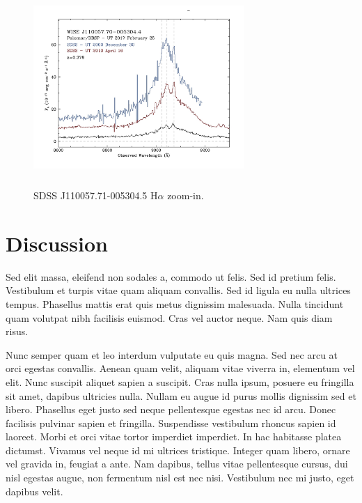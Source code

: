 \documentclass{emulateapj}
\begin{document}
\begin{figure}
  \includegraphics[width=8.00cm, height=7.50cm, trim=0.0cm 0.0cm 0.0cm 0.0cm, clip]
  {../plots/w1100m0052_halpha.jpg}
  \centering
  \caption[]{SDSS J110057.71-005304.5 H$\alpha$ zoom-in.}
 \label{fig:w1100m0052_halpha}
\end{figure}



\section{Discussion}
Sed elit massa, eleifend non sodales a, commodo ut felis. Sed id
pretium felis. Vestibulum et turpis vitae quam aliquam convallis. Sed
id ligula eu nulla ultrices tempus. Phasellus mattis erat quis metus
dignissim malesuada. Nulla tincidunt quam volutpat nibh facilisis
euismod. Cras vel auctor neque. Nam quis diam risus.

Nunc semper quam et leo interdum vulputate eu quis magna. Sed nec arcu
at orci egestas convallis. Aenean quam velit, aliquam vitae viverra
in, elementum vel elit. Nunc suscipit aliquet sapien a suscipit. Cras
nulla ipsum, posuere eu fringilla sit amet, dapibus ultricies
nulla. Nullam eu augue id purus mollis dignissim sed et
libero. Phasellus eget justo sed neque pellentesque egestas nec id
arcu. Donec facilisis pulvinar sapien et fringilla. Suspendisse
vestibulum rhoncus sapien id laoreet. Morbi et orci vitae tortor
imperdiet imperdiet. In hac habitasse platea dictumst. Vivamus vel
neque id mi ultrices tristique. Integer quam libero, ornare vel
gravida in, feugiat a ante. Nam dapibus, tellus vitae pellentesque
cursus, dui nisl egestas augue, non fermentum nisl est nec
nisi. Vestibulum nec mi justo, eget dapibus velit.
\end{document}
